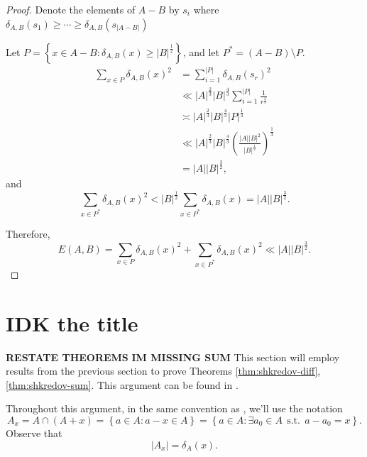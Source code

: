 \documentclass[12pt,reqno]{amsart}
\begin{document}
\begin{proof}
Denote the elements of \(A-B\) by \(s_{i} \) where \(\delta_{A,B} (s_1) \geq \cdots \geq \delta_{A,B} (s _{\left\lvert A-B \right\rvert } )\)

Let \(P = \left\{ x \in A - B : \delta_{A,B} (x) \geq \left\lvert B \right\rvert ^{\frac{1}{2} } \right\} \), and let \(P ^{*} = \left( A - B \right) \setminus P\).
\begin{align*}
    \sum _{x \in P} \delta_{A,B} (x)^{2} & =  \sum_{i=1}^{\left\lvert P \right\rvert } \delta_{A,B} (s _{r} )^{2}\\
    & \ll \left\lvert A \right\rvert ^{\frac{2}{3} } \left\lvert B \right\rvert ^{\frac{4}{3} } \sum_{i=1}^{\left\lvert P \right\rvert } \frac{1}{r^{\frac{2}{3} }} \\
    & \asymp \left\lvert A \right\rvert ^{\frac{2}{3} } \left\lvert B \right\rvert ^{\frac{4}{3} } \left\lvert P \right\rvert ^{\frac{1}{3} }\\
    & \ll \left\lvert A \right\rvert ^{\frac{2}{3} } \left\lvert B \right\rvert ^{\frac{4}{3} } \left( \frac{\left\lvert A \right\rvert \left\lvert B \right\rvert ^{2}}{\left\lvert B \right\rvert ^{\frac{1}{2} }}  \right) ^{\frac{1}{3} }\\
    & = \left\lvert A \right\rvert \left\lvert B \right\rvert ^{\frac{3}{2} },
\end{align*}
and
\[
    \sum _{x \in P^{*}} \delta_{A,B} (x)^{2} < \left\lvert B \right\rvert ^{\frac{1}{2} } \sum _{x \in P^{*}} \delta_{A,B} (x) = \left\lvert A \right\rvert \left\lvert B \right\rvert ^{\frac{3}{2} }
.\]

Therefore,
\[
    E(A,B) = \sum _{x \in P} \delta_{A,B} (x)^{2} + \sum _{x \in P ^{*}} \delta_{A,B} (x)^{2} \ll \left\lvert A \right\rvert \left\lvert B \right\rvert ^{\frac{3}{2} } 
.\]
\end{proof}

\section{ \textbf{IDK the title }}
\textbf{RESTATE THEOREMS} 
\textbf{IM MISSING SUM}
This section will employ results from the previous section to prove Theorems \ref{thm:shkredov-diff}, \ref{thm:shkredov-sum}.
This argument can be found in \cite{shkredov}.

Throughout this argument, in the same convention as \cite{shkredov}, we'll use the
notation
\[
    A_{x} = A \cap \left( A + x \right) = \left\{ a \in A : a - x \in A \right\} = \left\{ a \in A : \exists a_0 \in A ~~\text{s.t.}~~ a - a_0 = x \right\} 
.\]
Observe that
\[
    \left\lvert A_{x}  \right\rvert = \delta_{A} (x) 
.\]
\end{document}

